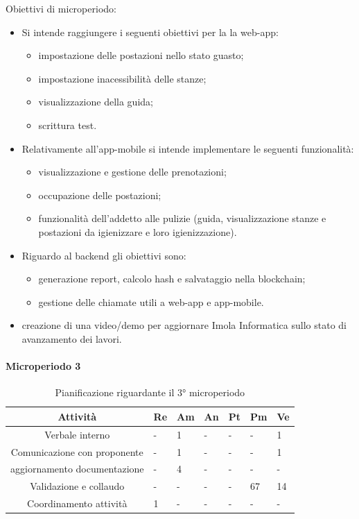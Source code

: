Obiettivi di microperiodo:
\begin{itemize}
	\item Si intende raggiungere i seguenti obiettivi per la la web-app:
	\begin{itemize}
		\item impostazione delle postazioni nello stato guasto; 
		\item impostazione inacessibilità delle stanze;
		\item visualizzazione della guida;
		\item scrittura test.
	\end{itemize}
	\item Relativamente all'app-mobile si intende implementare le seguenti funzionalità:
	\begin{itemize}
		\item visualizzazione e gestione delle prenotazioni;
		\item occupazione delle postazioni;
		\item funzionalità dell'addetto alle pulizie (guida, visualizzazione stanze e postazioni da igienizzare e loro igienizzazione).
	\end{itemize}
	\item Riguardo al backend gli obiettivi sono:
	\begin{itemize}
		\item generazione report, calcolo hash e salvataggio nella blockchain;
		\item gestione delle chiamate utili a web-app e app-mobile.
	\end{itemize}
\item creazione di una video/demo per aggiornare Imola Informatica sullo stato di avanzamento dei lavori.
\end{itemize}

\paragraph{Microperiodo 3}
\begin{table}[H]
	\centering
	\renewcommand{\arraystretch}{1.5}
	\begin{tabular}{|c|p{10mm}|p{10mm}|p{10mm}|p{10mm}|p{10mm}|p{10mm}|}
		\hline
		\rowcolor{lighter-grayer}
		\textbf{Attività}                         & \textbf{Re} & \textbf{Am} & \textbf{An} & \textbf{Pt} & \textbf{Pm} & \textbf{Ve} \\ \hline
		Verbale interno              & - & 1 & - & - & -  & 1  \\ \hline
		Comunicazione con proponente & -           & 1           & -           & -           & -           & 1           \\ \hline
		aggiornamento documentazione & - & 4 & - & - & -  & -  \\ \hline
		Validazione e collaudo       & - & - & - & - & 67 & 14 \\ \hline
		Coordinamento attività       & 1 & - & - & - & -  & -  \\ \hline
	\end{tabular}
	\caption{ Pianificazione riguardante il 3° microperiodo\\}
\end{table}

